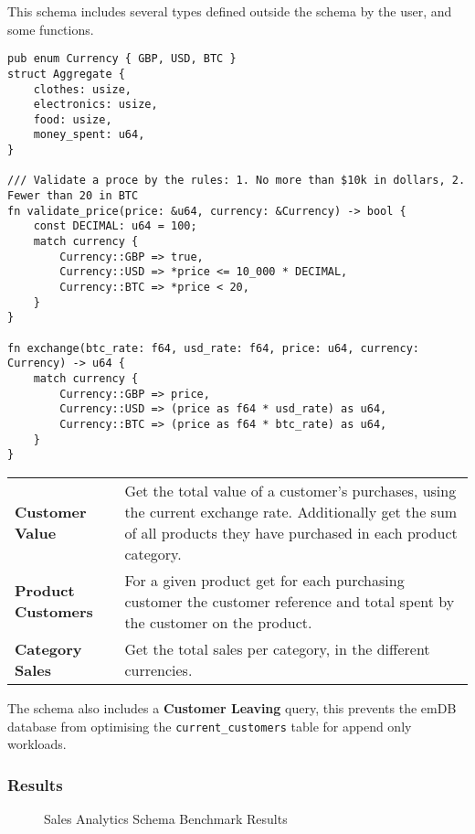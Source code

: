 This schema includes several types defined outside the schema by the user, and some functions.
\begin{verbatim}
pub enum Currency { GBP, USD, BTC }
struct Aggregate {
    clothes: usize,
    electronics: usize,
    food: usize,
    money_spent: u64,
}

/// Validate a proce by the rules: 1. No more than $10k in dollars, 2. Fewer than 20 in BTC
fn validate_price(price: &u64, currency: &Currency) -> bool {
    const DECIMAL: u64 = 100;
    match currency {
        Currency::GBP => true,
        Currency::USD => *price <= 10_000 * DECIMAL,
        Currency::BTC => *price < 20,
    }
}

fn exchange(btc_rate: f64, usd_rate: f64, price: u64, currency: Currency) -> u64 {
    match currency {
        Currency::GBP => price,
        Currency::USD => (price as f64 * usd_rate) as u64,
        Currency::BTC => (price as f64 * btc_rate) as u64,
    }
}
\end{verbatim}
\begin{center}
    \begin{tabular}{l p{}}
        \textbf{Customer Value} & Get the total value of a customer's purchases, using the current exchange
         rate. Additionally get the sum of all products they have purchased in each product category. \\
        \textbf{Product Customers} & For a given product get for each purchasing customer the customer reference and total spent by the customer on the product. \\
        \textbf{Category Sales}     &  Get the total sales per category, in the different currencies. \\
    \end{tabular}
\end{center}
\noindent
The schema also includes a \textbf{Customer Leaving} query, this prevents the emDB database from optimising the \texttt{current_customers} table for append only workloads.
\subsubsection{Results}
\begin{figure}[h!]
    \centering
    \vspace{-0.4em}
    \resizebox{\textwidth}{!}{}
    \caption{Sales Analytics Schema Benchmark Results}
    \label{fig:sales_analysis_access_queries}
\end{figure}
